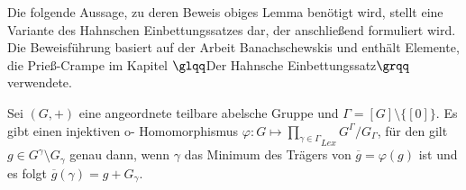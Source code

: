 %
Die folgende Aussage, zu deren Beweis obiges Lemma benötigt wird, stellt eine Variante des Hahnschen Einbettungssatzes dar, der anschließend formuliert wird. Die Beweisführung basiert auf der Arbeit Banachschewskis \cite[S. 431 - 433]{banachschewski56} und enthält Elemente, die Prieß-Crampe im Kapitel $\glqq$Der Hahnsche Einbettungssatz$\grqq$ \cite[Satz 2, S. 16 - 18]{priesscrampe83} verwendete.
%
%
\begin{satz}\label{satzBanachschewski}
Sei $\left(G, +\right)$ eine angeordnete teilbare abelsche Gruppe und $\Gamma = [G]\setminus \lbrace [0]\rbrace$. Es gibt einen injektiven o- Homomorphismus $\varphi: G \mapsto  {\prod_{\gamma \in \Gamma}}_{Lex} G^\Gamma/ G_\Gamma$, für den gilt $g \in G^\gamma \setminus G_\gamma$ genau dann, wenn $\gamma$ das Minimum des Trägers von $\overline{g} = \varphi(g)$ ist und es folgt $\overline{g}(\gamma) = g + G_\gamma.$
\end{satz}
